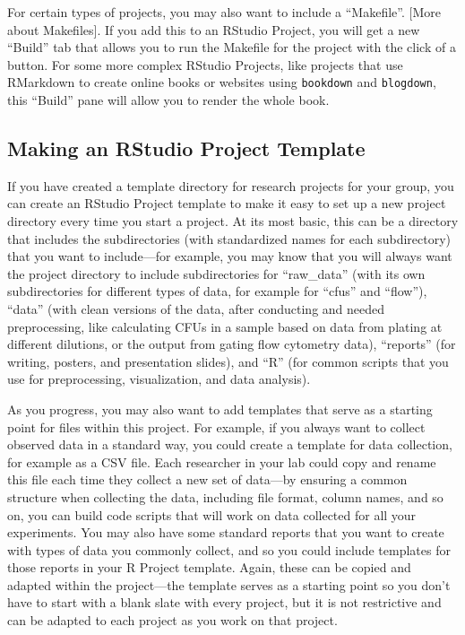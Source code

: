 \documentclass[]{tufte-book}
\begin{document}
For certain types of projects, you may also want to include a ``Makefile''. {[}More
about Makefiles{]}. If you add this to an RStudio Project, you will get a new
``Build'' tab that allows you to run the Makefile for the project with the click of
a button. For some more complex RStudio Projects, like projects that use RMarkdown
to create online books or websites using \texttt{bookdown} and \texttt{blogdown}, this ``Build''
pane will allow you to render the whole book.

\hypertarget{making-an-rstudio-project-template}{%
\subsection{Making an RStudio Project Template}\label{making-an-rstudio-project-template}}

If you have created a template directory for research projects for your group,
you can create an RStudio Project template to make it easy to set up a new
project directory every time you start a project. At its most basic, this can be
a directory that includes the subdirectories (with standardized names for each
subdirectory) that you want to include---for example, you may know that you will
always want the project directory to include subdirectories for ``raw\_data'' (with
its own subdirectories for different types of data, for example for ``cfus'' and
``flow''), ``data'' (with clean versions of the data, after conducting and needed
preprocessing, like calculating CFUs in a sample based on data from plating at
different dilutions, or the output from gating flow cytometry data), ``reports''
(for writing, posters, and presentation slides), and ``R'' (for common scripts
that you use for preprocessing, visualization, and data analysis).

As you progress, you may also want to add templates that serve as a starting point
for files within this project. For example, if you always want to collect
observed data in a standard way, you could create a template for data collection,
for example as a CSV file. Each researcher in your lab could copy and rename this
file each time they collect a new set of data---by ensuring a common structure
when collecting the data, including file format, column names, and so on, you can
build code scripts that will work on data collected for all your experiments. You
may also have some standard reports that you want to create with types of data
you commonly collect, and so you could include templates for those reports in your
R Project template. Again, these can be copied and adapted within the project---the
template serves as a starting point so you don't have to start with a blank slate
with every project, but it is not restrictive and can be adapted to each project
as you work on that project.
\end{document}
